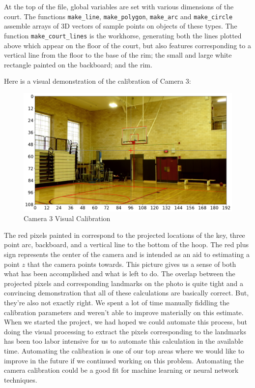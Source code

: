 \documentclass{article}
\begin{document}
At the top of the file, global variables are set with various dimensions of the court.
The functions \texttt{make\_line}, \texttt{make\_polygon}, \texttt{make\_arc}  and \texttt{make\_circle}
assemble arrays of 3D vectors of sample points on objects of these types.
The function \texttt{make\_court\_lines} is the workhorse, generating both the lines plotted above
which appear on the floor of the court, but also features corresponding to a vertical line from the
floor to the base of the rim; the small and large white rectangle painted on the backboard;
and the rim.

Here is a visual demonstration of the calibration of Camera 3:
\begin{figure}[H]
\center
\includegraphics[width=1.00\textwidth]{Camera3_calibration.png}
\caption*{Camera 3 Visual Calibration}
\end{figure}

The red pixels painted in correspond to the projected locations of the key,
three point arc, backboard, and a vertical line to the bottom of the hoop.
The red plus sign represents the center of the camera and is intended as an aid
to estimating a point $z$ that the camera points towards.
This picture gives us a sense of both what has been accomplished and what is left to do.
The overlap between the projected pixels and corresponding landmarks on the photo is quite tight
and a convincing demonstration that all of these calculations are basically correct.
But, they're also not exactly right.  We spent a lot of time manually fiddling the calibration parameters
and weren't able to improve materially on this estimate.
When we started the project, we had hoped we could automate this process, but doing the visual
processing to extract the pixels corresponding to the landmarks has been too labor intensive for us
to automate this calculation in the available time.  
Automating the calibration is one of our top areas where we would like to improve in the future
if we continued working on this problem.  
Automating the camera calibration could be a good fit for machine learning or neural network techniques.
\end{document}
